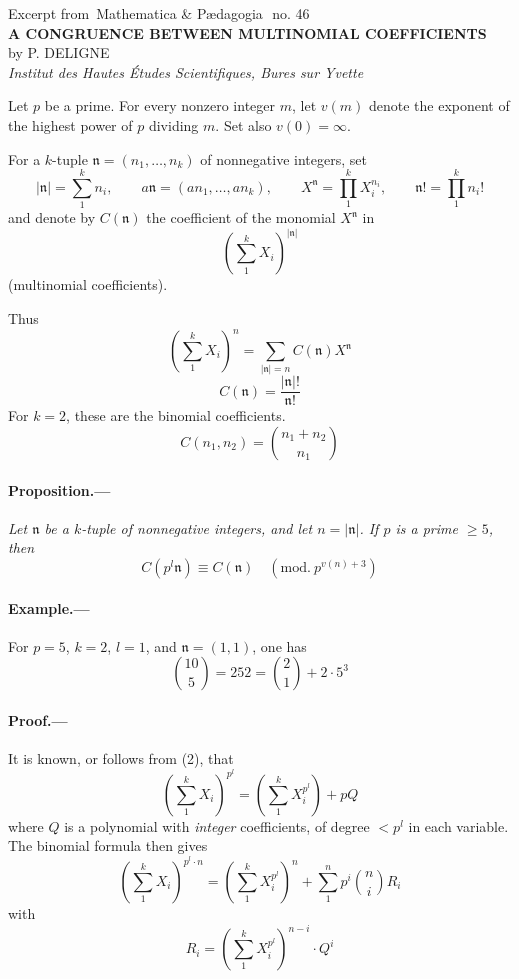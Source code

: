 \documentclass[10pt]{article}
\newcommand{\og}{\guillemotleft\,}
\newcommand{\fg}{\,\guillemotright}
\newcommand{\nn}{\mathfrak n}
\begin{document}
\begin{center}
{\large Excerpt from \og Mathematica \& Pædagogia\fg\ no. 46}\\[2.4em]
{\Large\bfseries A CONGRUENCE BETWEEN MULTINOMIAL COEFFICIENTS}\\[1.0em]
by P. DELIGNE\\
{\itshape Institut des Hautes Études Scientifiques, Bures sur Yvette}
\end{center}

\medskip

Let $p$ be a prime. For every nonzero integer $m$, let $v(m)$ denote the exponent of the highest power of $p$ dividing $m$. Set also $v(0)=\infty$.

For a $k$-tuple $\nn=(n_1,\ldots,n_k)$ of nonnegative integers, set
\[
|\nn|=\sum_1^k n_i,\qquad
a\nn=(an_1,\ldots,an_k),\qquad
X^\nn=\prod_1^k X_i^{n_i},\qquad
\nn! = \prod_1^k n_i!
\]
and denote by $C(\nn)$ the coefficient of the monomial $X^\nn$ in
\[
\left(\sum_1^k X_i\right)^{|\nn|}
\]
(multinomial coefficients).

Thus
\[
\left(\sum_1^k X_i\right)^n
=\sum_{|\nn|=n} C(\nn)X^\nn \tag{1}
\]
\[
C(\nn)=\frac{|\nn|!}{\nn!} \tag{2}
\]
For $k=2$, these are the binomial coefficients.
\[
C(n_1,n_2)=\binom{n_1+n_2}{n_1} \tag{3}
\]

\paragraph{Proposition.---} \emph{Let $\nn$ be a $k$-tuple of nonnegative integers, and let $n=|\nn|$. If $p$ is a prime $\ge5$, then}
\[
C(p^l\nn)\equiv C(\nn)\quad(\mathrm{mod.}\ p^{v(n)+3}) \tag{4}
\]

\paragraph{Example.---} For $p=5$, $k=2$, $l=1$, and $\nn=(1,1)$, one has
\[
\binom{10}{5}=252=\binom21+2\cdot5^3
\]

\paragraph{Proof.---} It is known, or follows from (2), that
\[
\left(\sum_{1}^k X_i\right)^{p^l}
=
\left(\sum_{1}^k X_i^{p^l}\right)+pQ \tag{5}
\]
where $Q$ is a polynomial with \emph{integer} coefficients, of degree $<p^l$ in each variable. The binomial formula then gives
\[
\left(\sum_{1}^k X_i\right)^{p^l\cdot n}
=
\left(\sum_{1}^k X_i^{p^l}\right)^n
+\sum_{1}^n p^i\binom ni R_i \tag{6}
\]
with
\[
R_i=
\left(\sum_{1}^k X_i^{p^l}\right)^{n-i}\cdot Q^i \tag{7}
\]
\end{document}
